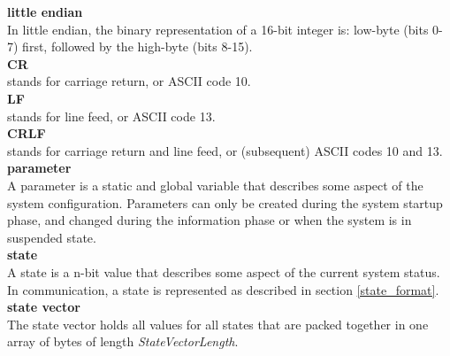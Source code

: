 \documentclass[letterpaper,oneside,12pt]{book}
\begin{document}
\textbf{little endian} \\
In little endian, the binary representation of a 16-bit integer is: low-byte (bits 0-7)
first, followed by the high-byte (bits 8-15).
\\[2ex]
\textbf{CR} \\
stands for carriage return, or {ASCII} code 10.
\\[2ex]
\textbf{LF} \\
stands for line feed, or {ASCII} code 13.
\\[2ex]
\textbf{CRLF} \\
stands for carriage return and line feed, or (subsequent) {ASCII} codes 10 and 13.
\\[2ex]
\textbf{parameter} \\
A parameter is a static and global variable that describes some aspect of the 
system configuration. Parameters can only be created during the system startup phase, and changed during the information phase or when the system is in suspended state.
\\[2ex]
\textbf{state} \\
A state is a n-bit value that describes some aspect of the current system 
status. In communication, a state is represented as described in section
\ref{state_format}.
\\[2ex]
\textbf{state vector} \\
The state vector holds all values for all states that are packed together in one
array of bytes of length \textit{StateVectorLength}.


\backmatter
\end{document}
